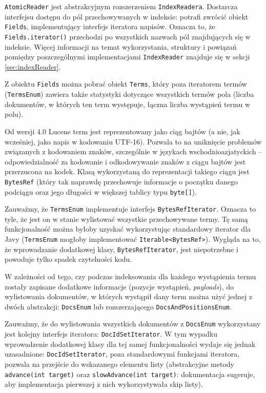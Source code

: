 \texttt{AtomicReader} jest abstrakcyjnym rozszerzeniem \texttt{IndexReadera}. Dostarcza interfejsu dostępu do pól przechowywanych w indeksie: potrafi zwrócić obiekt \texttt{Fields}, implementujący interfejs iteratora napisów. Oznacza to, że \texttt{Fields.iterator()} przechodzi po wszystkich nazwach pól znajdujących się w indeksie. Więcej informacji na temat wykorzystania, struktury i powiązań pomiędzy poszczególnymi implementacjami \texttt{IndexReader} znajduje się w sekcji \ref{sec:indexReader}.

Z obiektu \texttt{Fields} można pobrać obiekt \texttt{Terms}, który poza iteratorem termów (\texttt{TermsEnum}) zawiera także statystyki dotyczące wszystkich termów pola (liczba dokumentów, w których ten term występuje, łączna liczba wystąpień termu w polu).

Od wersji 4.0 Lucene term jest reprezentowany jako ciąg bajtów (a nie, jak wcześniej, jako napis w kodowaniu UTF-16). Pozwala to na uniknięcie problemów związanych z kodowaniem znaków, szczególnie w językach wschodnioazjatyckich -- odpowiedzialność za kodowanie i odkodowywanie znaków z ciągu bajtów jest przerzucona na kodek. Klasą wykorzystaną do reprezentacji takiego ciągu jest \texttt{BytesRef} (który tak naprawdę przechowuje informacje o początku danego podciągu oraz jego długości w większej tablicy typu \texttt{byte[]}).

Zauważmy, że \texttt{TermsEnum} implementuje interfejs \texttt{BytesRefIterator}. Oznacza to tyle, że jest on w stanie wylistować wszystkie przechowywane termy. Tę samą funkcjonalność można byłoby uzyskać wykorzystując standardowy iterator dla Javy (\texttt{TermsEnum} mogłoby implementować \texttt{Iterable<BytesRef>}). Wygląda na to, że wprowadzanie dodatkowej klasy, \texttt{BytesRefIterator}, jest niepotrzebne i powoduje tylko spadek czytelności kodu.

W zależności od tego, czy podczas indeksowania dla każdego wystąpienia termu zostały zapisane dodatkowe informacje (pozycje wystąpień, \emph{payloads}), do wylistowania dokumentów, w których wystąpił dany term można użyć jednej z dwóch abstrakcji: \texttt{DocsEnum} lub rozszerzającego \texttt{DocsAndPositionsEnum}. 

Zauważmy, że do wylistowania wszystkich dokumentów z \texttt{DocsEnum} wykorzystany jest kolejny interfejs iteratora: \texttt{DocIdSetIterator}. W tym wypadku wprowadzenie dodatkowej klasy dla tej samej funkcjonalności wydaje się jednak uzasadnione: \texttt{DocIdSetIterator}, poza standardowymi funkcjami iteratora, pozwala na przejście do wskazanego elementu listy (abstrakcyjne metody \texttt{advance(int target)} oraz \texttt{slowAdvance(int target)}: dokumentacja sugeruje, aby implementacja pierwszej z nich wykorzystywała skip listy).

